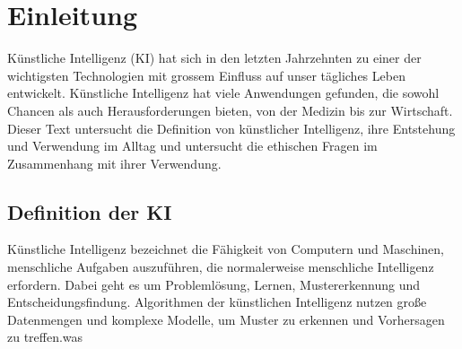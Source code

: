 \chapter{Einleitung}
Künstliche Intelligenz (KI) hat sich in den letzten Jahrzehnten zu einer der wichtigsten Technologien mit grossem Einfluss auf unser tägliches Leben entwickelt. Künstliche Intelligenz hat viele Anwendungen gefunden, die sowohl Chancen als auch Herausforderungen bieten, von der Medizin bis zur Wirtschaft. Dieser Text untersucht die Definition von künstlicher Intelligenz, ihre Entstehung und Verwendung im Alltag und untersucht die ethischen Fragen im Zusammenhang mit ihrer Verwendung.
\section{Definition der KI}
Künstliche Intelligenz bezeichnet die Fähigkeit von Computern und Maschinen, menschliche Aufgaben auszuführen, die normalerweise menschliche Intelligenz erfordern. Dabei geht es um Problemlösung, Lernen, Mustererkennung und Entscheidungsfindung. Algorithmen der künstlichen Intelligenz nutzen große Datenmengen und komplexe Modelle, um Muster zu erkennen und Vorhersagen zu treffen.was
